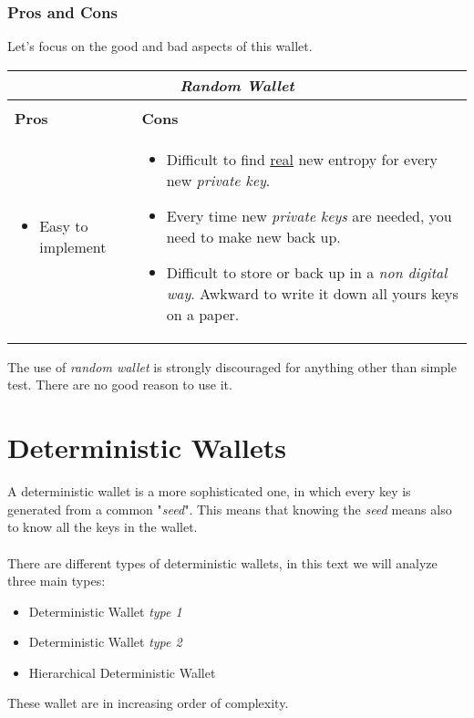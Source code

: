 \subsubsection{Pros and Cons}
Let's focus on the good and bad aspects of this wallet.

\begin{center}
	\begin{tabular}{ |p{6cm}|p{6cm}|  }
	\hline
	\multicolumn{2}{|c|}{\textbf{\textit{Random Wallet}}} \\
	\hline \hline 
	\\
	\centerline{\textbf{Pros}}&\centerline{\textbf{Cons}}\\
	\hline
	\begin{itemize}
		\item Easy to implement
	\end{itemize} &
	\begin{itemize}
		\item Difficult to find \underline{real} new entropy for every new \textit{private key}.
		\item Every time new \textit{private keys} are needed, you need to make new back up.
		\item Difficult to store or back up in a \textit{non digital way}. Awkward to write it down all yours keys on a paper.
	\end{itemize}\\
	\hline
\end{tabular}
\end{center}

The use of \textit{random wallet} is strongly discouraged for anything other than simple test. There are no good reason to use it.

\section{Deterministic Wallets}
A deterministic wallet is a more sophisticated one, in which every key is generated from a common "\textit{seed}". This means that knowing the \textit{seed} means also to know all the keys in the wallet.\\ \\
There are different types of deterministic wallets, in this text we will analyze three main types:
\begin{itemize}
	\item Deterministic Wallet \textit{type 1}
	\item Deterministic Wallet \textit{type 2}
	\item Hierarchical Deterministic Wallet
\end{itemize}
These wallet are in increasing order of complexity.

